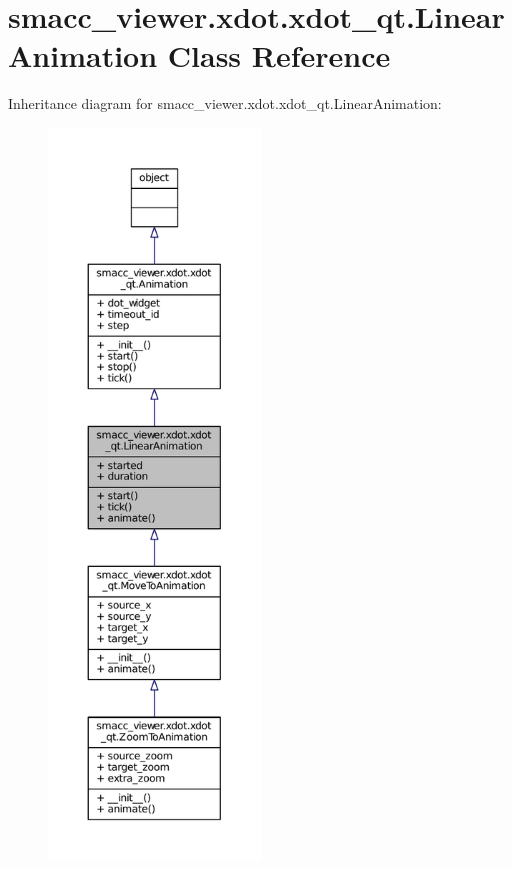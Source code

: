 \hypertarget{classsmacc__viewer_1_1xdot_1_1xdot__qt_1_1LinearAnimation}{}\section{smacc\+\_\+viewer.\+xdot.\+xdot\+\_\+qt.\+Linear\+Animation Class Reference}
\label{classsmacc__viewer_1_1xdot_1_1xdot__qt_1_1LinearAnimation}


Inheritance diagram for smacc\+\_\+viewer.\+xdot.\+xdot\+\_\+qt.\+Linear\+Animation\+:
\nopagebreak
\begin{figure}[H]
\begin{center}
\leavevmode
\includegraphics[height=550pt]{classsmacc__viewer_1_1xdot_1_1xdot__qt_1_1LinearAnimation__inherit__graph}
\end{center}
\end{figure}


